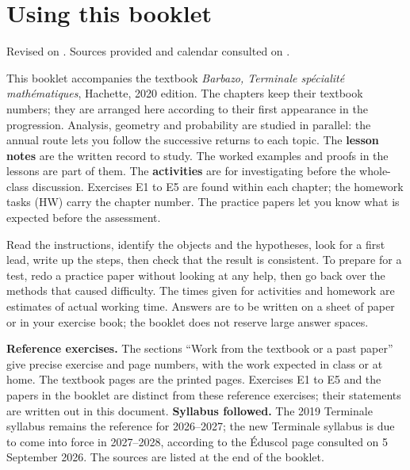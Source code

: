 \frontmatter
\chapter*{Using this booklet}
Revised on . Sources provided and calendar consulted on .

This booklet accompanies the textbook \emph{Barbazo, Terminale spécialité mathématiques}, Hachette, 2020 edition. The chapters keep their textbook numbers; they are arranged here according to their first appearance in the progression. Analysis, geometry and probability are studied in parallel: the annual route lets you follow the successive returns to each topic.
The \textbf{lesson notes} are the written record to study. The worked examples and proofs in the lessons are part of them. The \textbf{activities} are for investigating before the whole-class discussion. Exercises E1 to E5 are found within each chapter; the homework tasks (HW) carry the chapter number. The practice papers let you know what is expected before the assessment.
\begin{keypoint}
Read the instructions, identify the objects and the hypotheses, look for a first lead, write up the steps, then check that the result is consistent. To prepare for a test, redo a practice paper without looking at any help, then go back over the methods that caused difficulty.
The times given for activities and homework are estimates of actual working time. Answers are to be written on a sheet of paper or in your exercise book; the booklet does not reserve large answer spaces.
\end{keypoint}
\textbf{Reference exercises.} The sections ``Work from the textbook or a past paper'' give precise exercise and page numbers, with the work expected in class or at home. The textbook pages are the printed pages. Exercises E1 to E5 and the papers in the booklet are distinct from these reference exercises; their statements are written out in this document.
\textbf{Syllabus followed.} The 2019 Terminale syllabus remains the reference for 2026--2027; the new Terminale syllabus is due to come into force in 2027--2028, according to the Éduscol page consulted on 5 September 2026. The sources are listed at the end of the booklet.
\ifmxteacher
\mxnewpage
